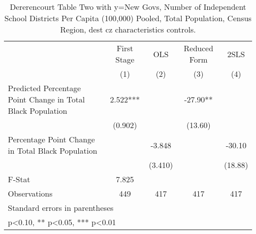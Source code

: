 \begin{table}[htbp]\centering
\def\sym#1{\ifmmode^{#1}\else\(^{#1}\)\fi}
\caption{Dererencourt Table Two with y=New Govs, Number of Independent School Districts Per Capita (100,000) Pooled, Total Population, Census Region, dest cz characteristics controls.}
\begin{tabular}{l*{4}{c}}
\toprule
                    & First Stage   &         OLS   &Reduced Form   &        2SLS   \\
                    &\multicolumn{1}{c}{(1)}   &\multicolumn{1}{c}{(2)}   &\multicolumn{1}{c}{(3)}   &\multicolumn{1}{c}{(4)}   \\
\midrule
Predicted Percentage Point Change in Total Black Population&       2.522***&               &      -27.90** &               \\
                    &     (0.902)   &               &     (13.60)   &               \\
\addlinespace
Percentage Point Change in Total Black Population&               &      -3.848   &               &      -30.10   \\
                    &               &     (3.410)   &               &     (18.88)   \\
\midrule
F-Stat              &       7.825   &               &               &               \\
Observations        &         449   &         417   &         417   &         417   \\
\bottomrule
\multicolumn{5}{l}{\footnotesize Standard errors in parentheses}\\
\multicolumn{5}{l}{\footnotesize * p<0.10, ** p<0.05, *** p<0.01}\\
\end{tabular}
\end{table}
